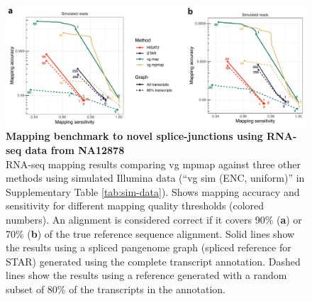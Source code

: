 \documentclass[11pt]{ucthesis}
\begin{document}
\begin{figure}[H]
\ssp
\begin{center}
\includegraphics[width=\textwidth]{mpmapfigures/figureS1.pdf}
\caption{\textbf{Mapping benchmark to novel splice-junctions using RNA-seq data from NA12878} \\
RNA-seq mapping results comparing vg mpmap against three other methods using simulated Illumina data (``vg sim (ENC, uniform)'' in Supplementary Table \ref{tab:sim-data}). Shows mapping accuracy and sensitivity for different mapping quality thresholds (colored numbers). An alignment is considered correct if it covers 90\% (\textbf{a}) or 70\% (\textbf{b}) of the true reference sequence alignment. Solid lines show the results using a spliced pangenome graph (spliced reference for STAR) generated using the complete transcript annotation. Dashed lines show the results using a reference generated with a random subset of 80\% of the transcripts in the annotation.
} \label{fig:splice-junction-mapping}
\end{center}
\end{figure}
\end{document}

